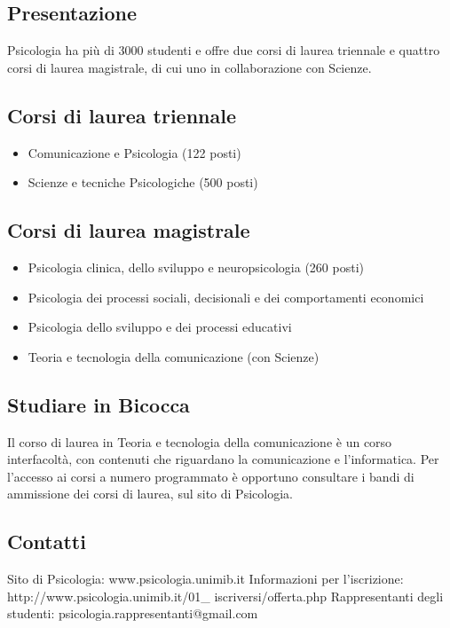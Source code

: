
\subsection{Presentazione}
Psicologia ha più di 3000 studenti e offre due corsi di laurea triennale e quattro corsi di laurea magistrale, di cui uno in collaborazione con Scienze. 

\subsection{Corsi di laurea triennale}
\begin{itemize}
\item Comunicazione e Psicologia (122 posti) 
\item Scienze e tecniche Psicologiche (500 posti) 
\end{itemize}

\subsection{Corsi di laurea magistrale}
\begin{itemize}
\item Psicologia clinica, dello sviluppo e neuropsicologia (260 posti) 
\item Psicologia dei processi sociali, decisionali e dei comportamenti economici 
\item Psicologia dello sviluppo e dei processi educativi 
\item Teoria e tecnologia della comunicazione (con Scienze)
\end{itemize}

\subsection{Studiare in Bicocca}
Il corso di laurea in Teoria e tecnologia della comunicazione è un corso interfacoltà, con contenuti che riguardano la comunicazione e l'informatica.  Per l'accesso ai corsi a numero programmato è opportuno consultare i bandi di ammissione dei corsi di laurea, sul sito di Psicologia. 

\subsection{Contatti}
Sito di Psicologia: www.psicologia.unimib.it 
Informazioni per l'iscrizione: http://www.psicologia.unimib.it/01\_ iscriversi/offerta.php 
Rappresentanti degli studenti: psicologia.rappresentanti@gmail.com 
